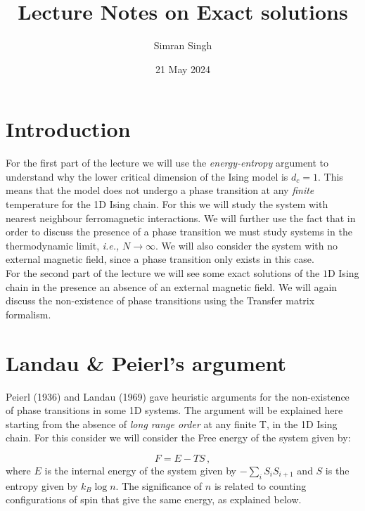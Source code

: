 \documentclass[11pt,a4paper]{article}
\begin{document}
\title{Lecture Notes on Exact solutions}
\author{Simran Singh}
\date{21 May 2024}
\maketitle

\tableofcontents
\newpage

\section{Introduction}

For the first part of the lecture we will use the \emph{energy-entropy} argument to understand why the lower critical dimension of the Ising model is $d_c = 1$. This means that the model does not undergo a phase transition at any \emph{finite} temperature for the 1D Ising chain. For this we will study the system with nearest neighbour ferromagnetic interactions. We will further use the fact that in order to discuss the presence of a phase transition we must study systems in the thermodynamic limit, \emph{i.e.,} $N \to \infty$. We will also consider the system with no external magnetic field, since a phase transition only exists in this case. \\

For the second part of the lecture we will see some exact solutions of the $1$D Ising chain in the presence an absence of an external magnetic field. We will again discuss the non-existence of phase transitions using the Transfer matrix formalism.

\section{Landau \& Peierl's argument}
Peierl (1936) and Landau (1969) gave heuristic arguments for the non-existence of phase transitions in some 1D systems. The argument will be explained here starting from the absence of \emph{long range order} at any finite T, in the 1D Ising chain. For this consider we will consider the Free energy of the system given by:

\begin{equation}
     F = E - T S \,,
\end{equation}
 where $E$ is the internal energy of the system given by $-\sum_{i} S_i S_{i+1}$ and $S$ is the entropy given by $k_B \log{n}$. The significance of $n$ is related to counting configurations of spin that give the same energy, as explained below.  
\end{document}
